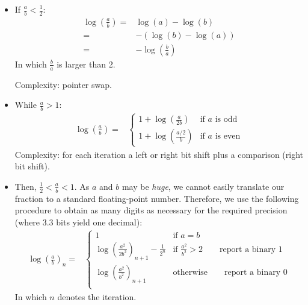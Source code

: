 \documentclass{article}
\begin{document}
                    \begin{itemize}
                        \item If $\frac{a}{b} < \frac{1}{2}$:
                        \begin{align*}
                            \log(\frac{a}{b}) ={}& \log(a) - \log(b)\\
                            {}={}& -(\log(b) - \log(a))\\
                            {}={}& -\log(\frac{b}{a})
                        \end{align*}
                        In which $\frac{b}{a}$ is larger than 2.
    
                        Complexity: pointer swap.
                        
                        \item While $\frac{a}{b} > 1$:
                        \begin{align*}
                            \log(\frac{a}{b}) ={}& \begin{cases}
                                1 + \log(\frac{a}{2b}) & \text{if } a \text{ is odd}\\
                                1 + \log(\frac{a/2}{b}) & \text{if } a \text{ is even} \end{cases}
                        \end{align*}
                        Complexity: for each iteration a left or right bit shift plus a comparison (right bit shift).
                        
                        \item Then, $\frac{1}{2} < \frac{a}{b} < 1$.
                        As $a$ and $b$ may be \emph{huge}, we cannot easily translate our fraction to a standard floating-point number.
                        Therefore, we use the following procedure to obtain as many digits as necessary for the required precision (where 3.3 bits yield one decimal):
                        \begin{align*}
                            \log(\frac{a}{b})_n ={}& \begin{cases}
                                1 & \text{if } a = b\\
                                \log(\frac{a^2}{2 b^2})_{n+1} - \frac{1}{2^n} & \text{if } \frac{a^2}{b^2} > 2 \qquad \text{report a binary } 1\\
                                \log(\frac{a^2}{b^2})_{n+1} & \text{otherwise} \qquad \text{report a binary } 0\\
                            \end{cases}
                        \end{align*}
                        In which $n$ denotes the iteration.
    

\end{itemize}
\end{document}
